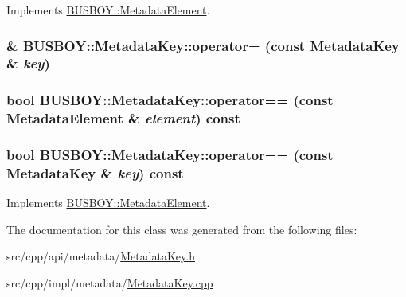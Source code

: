 Implements \hyperlink{classBUSBOY_1_1MetadataElement_a9895dfd3f251e26e8d818871405ce4c7}{BUSBOY::MetadataElement}.\hypertarget{classBUSBOY_1_1MetadataKey_a18dd60f986c1726dd29cd1885a749c1a}{
\subsubsection[{operator=}]{ \& BUSBOY::MetadataKey::operator= (const {\bf MetadataKey} \& {\em key})}}
\label{classBUSBOY_1_1MetadataKey_a18dd60f986c1726dd29cd1885a749c1a}
\hypertarget{classBUSBOY_1_1MetadataKey_a62aec68af806b11282897d3d37efb8c9}{
\subsubsection[{operator==}]{\setlength{\rightskip}{0pt plus 5cm}bool BUSBOY::MetadataKey::operator== (const {\bf MetadataElement} \& {\em element}) const}}
\label{classBUSBOY_1_1MetadataKey_a62aec68af806b11282897d3d37efb8c9}
\hypertarget{classBUSBOY_1_1MetadataKey_afc2527147e8aacc0368eaeb67ae8d1dc}{
\subsubsection[{operator==}]{\setlength{\rightskip}{0pt plus 5cm}bool BUSBOY::MetadataKey::operator== (const {\bf MetadataKey} \& {\em key}) const}}
\label{classBUSBOY_1_1MetadataKey_afc2527147e8aacc0368eaeb67ae8d1dc}


Implements \hyperlink{classBUSBOY_1_1MetadataElement_ac56f20521c49259ff043c2d69bc4c08e}{BUSBOY::MetadataElement}.

The documentation for this class was generated from the following files:\begin{DoxyCompactItemize}
\item 
src/cpp/api/metadata/\hyperlink{MetadataKey_8h}{MetadataKey.h}\item 
src/cpp/impl/metadata/\hyperlink{MetadataKey_8cpp}{MetadataKey.cpp}\end{DoxyCompactItemize}
